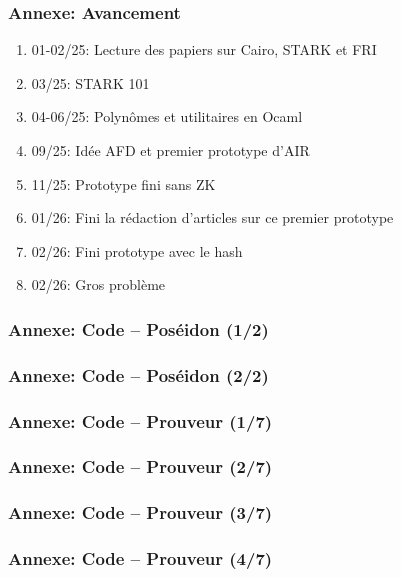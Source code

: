 \documentclass{beamer}
\begin{document}
\begin{frame}
\frametitle{Annexe: Avancement}
\begin{enumerate}
    \item 01-02/25: Lecture des papiers sur Cairo, STARK et FRI
    \item 03/25: STARK 101
    \item 04-06/25: Polynômes et utilitaires en Ocaml
    \item 09/25: Idée AFD et premier prototype d'AIR
    \item 11/25: Prototype fini sans ZK
    \item 01/26: Fini la rédaction d'articles sur ce premier prototype
    \item 02/26: Fini prototype avec le hash
    \item 02/26: Gros problème
\end{enumerate}
\end{frame}
\begin{frame}[fragile]
\frametitle{Annexe: Code -- Poséidon (1/2)}
\vspace{-2mm}

\end{frame}
\begin{frame}[fragile]
\frametitle{Annexe: Code -- Poséidon (2/2)}
\vspace{-2mm}

\end{frame}
\begin{frame}[fragile]
\frametitle{Annexe: Code -- Prouveur (1/7)}
\vspace{-2mm}

\end{frame}
\begin{frame}[fragile]
\frametitle{Annexe: Code -- Prouveur (2/7)}
\vspace{-2mm}

\end{frame}
\begin{frame}[fragile]
\frametitle{Annexe: Code -- Prouveur (3/7)}
\vspace{-2mm}

\end{frame}
\begin{frame}[fragile]
\frametitle{Annexe: Code -- Prouveur (4/7)}
\vspace{-2mm}

\end{frame}
\end{document}
